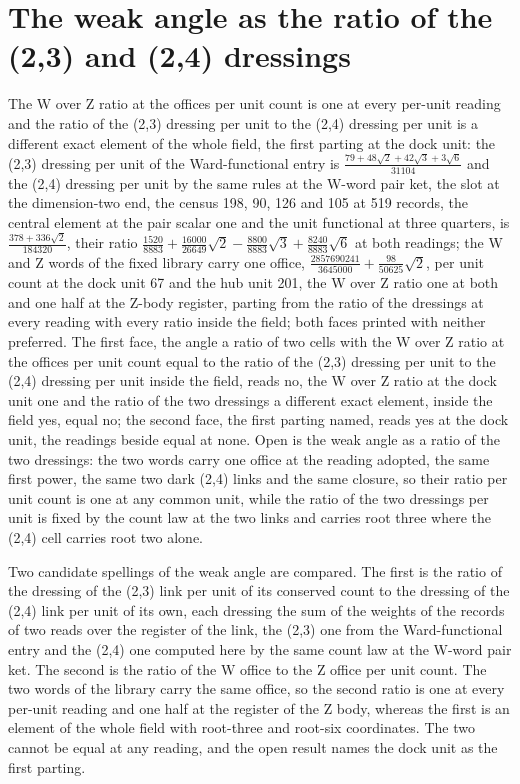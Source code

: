 \section{The weak angle as the ratio of the (2,3) and (2,4) dressings}\label{mod:VI-2a-D542880-w-wkar}
\begin{chwall}
The W over Z ratio at the offices per unit count is one at every per-unit reading and the ratio of the (2,3) dressing per unit to the (2,4) dressing per unit is a different exact element of the whole field, the first parting at the dock unit: the (2,3) dressing per unit of the Ward-functional entry is $\tfrac{79 + 48\sqrt{2} + 42\sqrt{3} + 3\sqrt{6}}{31104}$ and the (2,4) dressing per unit by the same rules at the W-word pair ket, the slot at the dimension-two end, the census 198, 90, 126 and 105 at 519 records, the central element at the pair scalar one and the unit functional at three quarters, is $\tfrac{378 + 336\sqrt{2}}{184320}$, their ratio $\tfrac{1520}{8883} + \tfrac{16000}{26649}\sqrt{2} - \tfrac{8800}{8883}\sqrt{3} + \tfrac{8240}{8883}\sqrt{6}$ at both readings; the W and Z words of the fixed library carry one office, $\tfrac{2857690241}{3645000} + \tfrac{98}{50625}\sqrt{2}$, per unit count at the dock unit 67 and the hub unit 201, the W over Z ratio one at both and one half at the Z-body register, parting from the ratio of the dressings at every reading with every ratio inside the field; both faces printed with neither preferred.
The first face, the angle a ratio of two cells with the W over Z ratio at the offices per unit count equal to the ratio of the (2,3) dressing per unit to the (2,4) dressing per unit inside the field, reads no, the W over Z ratio at the dock unit one and the ratio of the two dressings a different exact element, inside the field yes, equal no; the second face, the first parting named, reads yes at the dock unit, the readings beside equal at none. Open is the weak angle as a ratio of the two dressings: the two words carry one office at the reading adopted, the same first power, the same two dark (2,4) links and the same closure, so their ratio per unit count is one at any common unit, while the ratio of the two dressings per unit is fixed by the count law at the two links and carries root three where the (2,4) cell carries root two alone.
\end{chwall}
\chdeps{}{}
Two candidate spellings of the weak angle are compared. The first is the ratio of the dressing of the (2,3) link per unit of its conserved count to the dressing of the (2,4) link per unit of its own, each dressing the sum of the weights of the records of two reads over the register of the link, the (2,3) one from the Ward-functional entry and the (2,4) one computed here by the same count law at the W-word pair ket. The second is the ratio of the W office to the Z office per unit count. The two words of the library carry the same office, so the second ratio is one at every per-unit reading and one half at the register of the Z body, whereas the first is an element of the whole field with root-three and root-six coordinates. The two cannot be equal at any reading, and the open result names the dock unit as the first parting.

